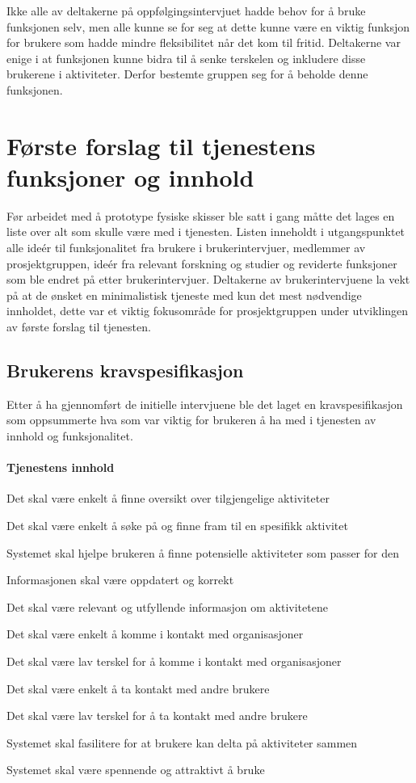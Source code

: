 Ikke alle av deltakerne på oppfølgingsintervjuet hadde behov for å bruke funksjonen selv, men alle kunne se for seg at dette kunne være en viktig funksjon for brukere som hadde mindre fleksibilitet når det kom til fritid. Deltakerne var enige i at funksjonen kunne bidra til å senke terskelen og inkludere disse brukerene i aktiviteter. Derfor bestemte gruppen seg for å beholde denne funksjonen.

\section{Første forslag til tjenestens funksjoner og innhold}

Før arbeidet med å prototype fysiske skisser ble satt i gang måtte det lages en liste over alt som skulle være med i tjenesten. Listen inneholdt i utgangspunktet alle ideér til funksjonalitet fra brukere i brukerintervjuer, medlemmer av prosjektgruppen, ideér fra relevant forskning og studier og reviderte funksjoner som ble endret på etter brukerintervjuer. Deltakerne av brukerintervjuene la vekt på at de ønsket en minimalistisk tjeneste med kun det mest nødvendige innholdet, dette var et viktig fokusområde for prosjektgruppen under utviklingen av første forslag til tjenesten.

\subsection{Brukerens kravspesifikasjon}
\label{section:kravspec}
Etter å ha gjennomført de initielle intervjuene ble det laget en kravspesifikasjon som oppsummerte hva som var viktig for brukeren å ha med i tjenesten av innhold og funksjonalitet.

\paragraph{Tjenestens innhold}
\begin{compactitem}
\item Det skal være enkelt å finne oversikt over tilgjengelige aktiviteter
\item Det skal være enkelt å søke på og finne fram til en spesifikk aktivitet
\item Systemet skal hjelpe brukeren å finne potensielle aktiviteter som passer for den
\item Informasjonen skal være oppdatert og korrekt
\item Det skal være relevant og utfyllende informasjon om aktivitetene
\item Det skal være enkelt å komme i kontakt med organisasjoner
\item Det skal være lav terskel for å komme i kontakt med organisasjoner
\item Det skal være enkelt å ta kontakt med andre brukere
\item Det skal være lav terskel for å ta kontakt med andre brukere
\item Systemet skal fasilitere for at brukere kan delta på aktiviteter sammen
\item Systemet skal være spennende og attraktivt å bruke
\end{compactitem}

